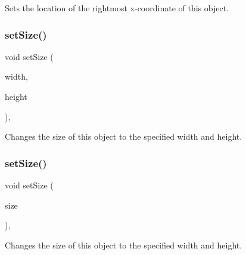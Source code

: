 Sets the location of the rightmost x-\/coordinate of this object. 

\mbox{\label{classsgl_1_1GObject_aca25d49481f9bf5fc8f7df4c086c4ce7}} 
\subsubsection{\texorpdfstring{set\+Size()}{setSize()}\hspace{0.1cm}{\footnotesize\ttfamily [1/2]}}
{\footnotesize\ttfamily void set\+Size (\begin{DoxyParamCaption}\item[{double}]{width,  }\item[{double}]{height }\end{DoxyParamCaption})\hspace{0.3cm}{\ttfamily [virtual]}, {\ttfamily [inherited]}}



Changes the size of this object to the specified width and height. 

\mbox{\label{classsgl_1_1GObject_ae2b628228f192c2702c4ce941b2af68f}} 
\subsubsection{\texorpdfstring{set\+Size()}{setSize()}\hspace{0.1cm}{\footnotesize\ttfamily [2/2]}}
{\footnotesize\ttfamily void set\+Size (\begin{DoxyParamCaption}\item[{const \mbox{\hyperlink{structsgl_1_1GDimension}{G\+Dimension}} \&}]{size }\end{DoxyParamCaption})\hspace{0.3cm}{\ttfamily [virtual]}, {\ttfamily [inherited]}}



Changes the size of this object to the specified width and height. 

\mbox{\label{classsgl_1_1GObject_a88203f28224315d9f4471212f4af8ed3}} 
